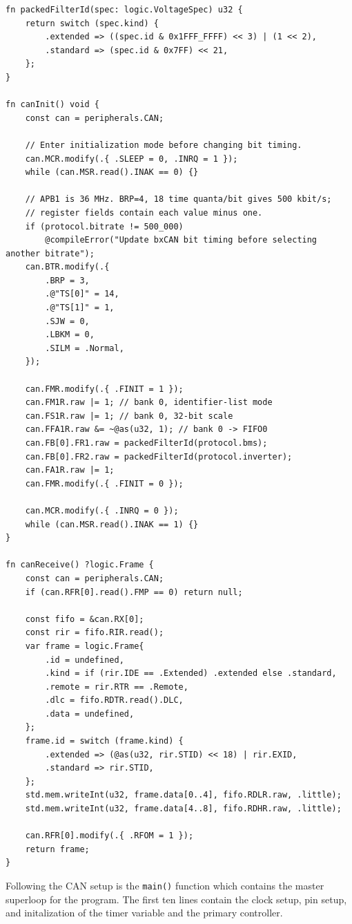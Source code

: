 \documentclass{article}
\begin{document}
\begin{lstlisting}[language=Zig, firstnumber=38]
fn packedFilterId(spec: logic.VoltageSpec) u32 {
    return switch (spec.kind) {
        .extended => ((spec.id & 0x1FFF_FFFF) << 3) | (1 << 2),
        .standard => (spec.id & 0x7FF) << 21,
    };
}

fn canInit() void {
    const can = peripherals.CAN;

    // Enter initialization mode before changing bit timing.
    can.MCR.modify(.{ .SLEEP = 0, .INRQ = 1 });
    while (can.MSR.read().INAK == 0) {}

    // APB1 is 36 MHz. BRP=4, 18 time quanta/bit gives 500 kbit/s;
    // register fields contain each value minus one.
    if (protocol.bitrate != 500_000)
        @compileError("Update bxCAN bit timing before selecting another bitrate");
    can.BTR.modify(.{
        .BRP = 3,
        .@"TS[0]" = 14,
        .@"TS[1]" = 1,
        .SJW = 0,
        .LBKM = 0,
        .SILM = .Normal,
    });

    can.FMR.modify(.{ .FINIT = 1 });
    can.FM1R.raw |= 1; // bank 0, identifier-list mode
    can.FS1R.raw |= 1; // bank 0, 32-bit scale
    can.FFA1R.raw &= ~@as(u32, 1); // bank 0 -> FIFO0
    can.FB[0].FR1.raw = packedFilterId(protocol.bms);
    can.FB[0].FR2.raw = packedFilterId(protocol.inverter);
    can.FA1R.raw |= 1;
    can.FMR.modify(.{ .FINIT = 0 });

    can.MCR.modify(.{ .INRQ = 0 });
    while (can.MSR.read().INAK == 1) {}
}

fn canReceive() ?logic.Frame {
    const can = peripherals.CAN;
    if (can.RFR[0].read().FMP == 0) return null;

    const fifo = &can.RX[0];
    const rir = fifo.RIR.read();
    var frame = logic.Frame{
        .id = undefined,
        .kind = if (rir.IDE == .Extended) .extended else .standard,
        .remote = rir.RTR == .Remote,
        .dlc = fifo.RDTR.read().DLC,
        .data = undefined,
    };
    frame.id = switch (frame.kind) {
        .extended => (@as(u32, rir.STID) << 18) | rir.EXID,
        .standard => rir.STID,
    };
    std.mem.writeInt(u32, frame.data[0..4], fifo.RDLR.raw, .little);
    std.mem.writeInt(u32, frame.data[4..8], fifo.RDHR.raw, .little);

    can.RFR[0].modify(.{ .RFOM = 1 });
    return frame;
}
\end{lstlisting}

Following the CAN setup is the \texttt{main()} function which contains the master superloop for the program. The first ten lines contain the clock setup, pin setup, and initalization of the timer variable and the primary controller.
\end{document}
